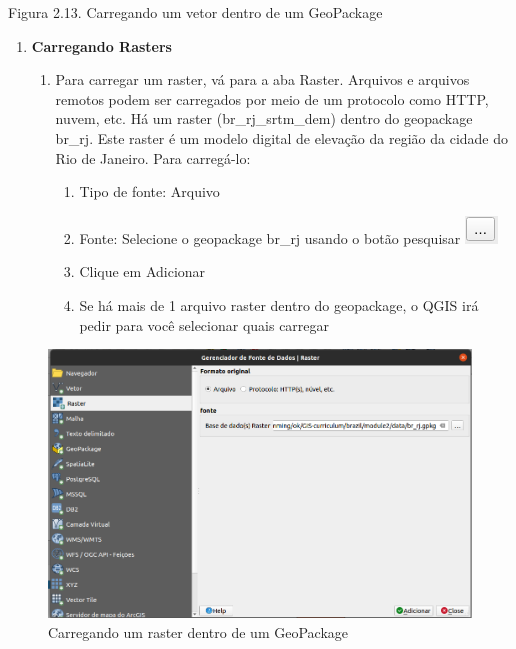 \documentclass[
  portuguese,
]{krantz}
\providecommand{\tightlist}{%
  \setlength{\itemsep}{0pt}\setlength{\parskip}{0pt}}
\begin{document}
Figura 2.13. Carregando um vetor dentro de um GeoPackage

\begin{enumerate}
\def\labelenumi{\arabic{enumi}.}
\setcounter{enumi}{2}
\item
  \textbf{Carregando Rasters}

  \begin{enumerate}
  \def\labelenumii{\arabic{enumii}.}
  \item
    Para carregar um raster, vá para a aba Raster. Arquivos e arquivos remotos podem ser carregados por meio de um protocolo como HTTP, nuvem, etc. Há um raster (br\_rj\_srtm\_dem) dentro do geopackage br\_rj. Este raster é um modelo digital de elevação da região da cidade do Rio de Janeiro. Para carregá-lo:

    \begin{enumerate}
    \def\labelenumiii{\arabic{enumiii}.}
    \tightlist
    \item
      Tipo de fonte: Arquivo
    \item
      Fonte: Selecione o geopackage br\_rj usando o botão pesquisar \includegraphics{media/modulo2/data-source-manager-search.png}
    \item
      Clique em Adicionar
    \item
      Se há mais de 1 arquivo raster dentro do geopackage, o QGIS irá pedir para você selecionar quais carregar
    \end{enumerate}
  \end{enumerate}
\end{enumerate}

\begin{figure}
\centering
\includegraphics{media/modulo2/data-source-manager-raster.png}
\caption{Carregando um raster dentro de um GeoPackage}
\end{figure}
\end{document}
